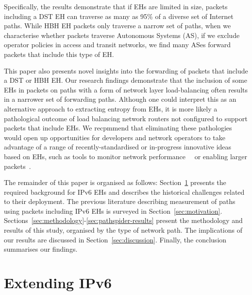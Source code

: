 \documentclass[conference]{IEEEtran}
\begin{document}

Specifically, the results demonstrate that if  EHs are limited in size,
packets including a DST EH can traverse as many as
95\% of a diverse set of Internet paths. While HBH EH packets only traverse a narrow set of paths, when we
characterise whether packets traverse Autonomous Systems (AS), if we exclude operator policies in access and transit networks, we find many ASes forward packets that include this type of EH.

This paper also presents novel insights into the forwarding of packets that include a DST or HBH EH. Our research findings
demonstrate that the inclusion of some EHs in packets on paths with a form of network layer load-balancing often results in a narrower set of forwarding paths. Although one could interpret this as an alternative approach to extracting entropy from EHs, it is more likely a
pathological outcome of load balancing network routers not configured to support packets that include EHs.
We recpmmend that eliminating these pathologies would open up opportunities for
developers and network operators to take advantage of a range of recently-standardised or in-progress innovative ideas based on EHs, such as tools to monitor network performance~\cite{rfc8250}~\cite{ietf-ippm-ioam-ipv6-options-10} or enabling larger packets~\cite{rfc9268}.


The remainder of this paper is organised as follows:  Section~\ref{sec:background} presents
the required background for IPv6 EHs and describes the historical challenges related to their deployment.  The previous literature describing measurement of paths using packets including IPv6
EHs is surveyed in Section~\ref{sec:motivation}.
Sections~\ref{sec:methodology}-\ref{sec:pathspider-results} present the
methodology and results of this study, organised by the type of network path.  The
implications of our results are discussed in Section~\ref{sec:discussion}.
Finally, the conclusion summarises our findings.

\section{Extending IPv6}
\label{sec:background}


\label{sec:ipv6-option-deployment}
\end{document}
